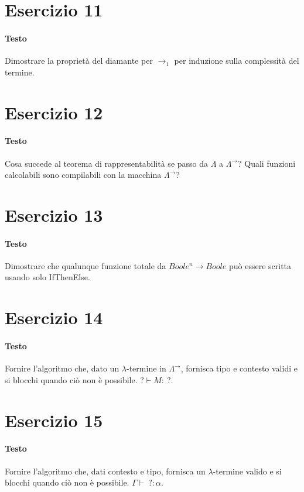 \documentclass[a4paper,11pt]{article}
\begin{document}
\section*{Esercizio 11}
\paragraph{Testo}
Dimostrare la proprietà del diamante per $\rightarrow_1$ per induzione sulla complessità del termine.

\section*{Esercizio 12}
\paragraph{Testo}
Cosa succede al teorema di rappresentabilità se passo da $\Lambda$ a $\Lambda^\rightarrow$? Quali funzioni calcolabili sono compilabili con la macchina $\Lambda^\rightarrow$?

\section*{Esercizio 13}
\paragraph{Testo}
Dimostrare che qualunque funzione totale da $Boole^n \rightarrow Boole$ può essere scritta usando solo IfThenElse.

\section*{Esercizio 14}
\paragraph{Testo}
Fornire l’algoritmo che, dato un $\lambda$-termine in $\Lambda^\rightarrow$, fornisca tipo e contesto validi e si blocchi quando ciò non è possibile. $? \vdash M :\: ?$.

\section*{Esercizio 15}
\paragraph{Testo}
Fornire l’algoritmo che, dati contesto e tipo, fornisca un $\lambda$-termine valido e si blocchi quando ciò non è possibile. $\Gamma \vdash \: ? : \alpha$.
\end{document}

